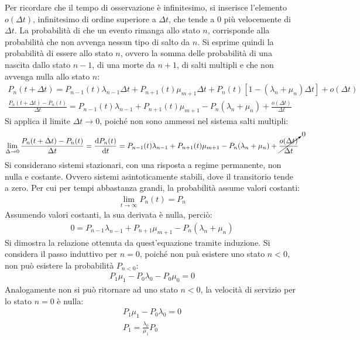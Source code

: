 \documentclass{article}
\newcommand{\df}{\mathrm{d}}
\numberwithin{equation}{subsection}
\begin{document}
Per ricordare che il tempo di osservazione è infinitesimo, si inserisce l'elemento $o(\Delta t)$, infinitesimo di ordine superiore a $\Delta t$, che tende a $0$ più 
velocemente di $\Delta t$. La probabilità di che un evento rimanga allo stato $n$, corrisponde alla probabilità che non avvenga nessun tipo di salto da $n$. Si 
esprime quindi la probabilità di essere allo stato $n$, ovvero la somma delle probabilità di una nascita dallo stato $n-1$, di una morte da $n+1$, di salti multipli e che 
non avvenga nulla allo stato $n$:
\begin{gather*}
    P_n(t+\Delta t)=P_{n-1}(t)\lambda_{n-1}\Delta t+P_{n+1}(t)\mu_{m+1}\Delta t+P_n(t)[1-(\lambda_n+\mu_n)\Delta t]+o(\Delta t)\\
    \displaystyle\frac{P_n(t+\Delta t)-P_n(t)}{\Delta t}=P_{n-1}(t)\lambda_{n-1}+P_{n+1}(t)\mu_{m+1}-P_n(\lambda_n+\mu_n)+\frac{o(\Delta t)}{\Delta t}
\end{gather*}
Si applica il limite $\Delta t\to0$, poiché non sono ammessi nel sistema salti multipli: 
\begin{gather*}
    \lim_{\Delta \to0}\displaystyle\displaystyle\frac{P_n(t+\Delta t)-P_n(t)}{\Delta t}=\frac{\df P_n(t)}{\df t}=P_{n-1}(t)\lambda_{n-1}+P_{n+1}(t)\mu_{m+1}-P_n(\lambda_n+\mu_n)+\cancelto{0}{\frac{o(\Delta t)}{\Delta t}}
\end{gather*}
Si considerano sistemi stazionari, con una risposta a regime permanente, non nulla e costante. Ovvero sistemi asintoticamente stabili, dove il transitorio tende a zero. 
Per cui per tempi abbastanza grandi, la probabilità assume valori costanti:
\begin{gather*}
    \displaystyle\lim_{t\to\infty}P_n(t)=P_n
\end{gather*}
Assumendo valori costanti, la sua derivata è nulla, perciò:
\begin{gather*}
    0=P_{n-1}\lambda_{n-1}+P_{n+1}\mu_{m+1}-P_n(\lambda_n+\mu_n)
\end{gather*}
Si dimostra la relazione ottenuta da quest'equazione tramite induzione. Si considera il passo induttivo per $n=0$, poiché non puà esistere uno stato $n<0$, non può esistere 
la probabilità $P_{n<0}$:
\begin{gather*}
    P_1\mu_1-P_0\lambda_0-P_0\mu_0=0
\end{gather*}
Analogamente non si può ritornare ad uno stato $n<0$, la velocità di servizio per lo stato $n=0$ è nulla:
\begin{gather*}
    P_1\mu_1-P_0\lambda_0=0\\
    P_1=\displaystyle\frac{\lambda_0}{\mu_1}P_0
\end{gather*}
\end{document}
